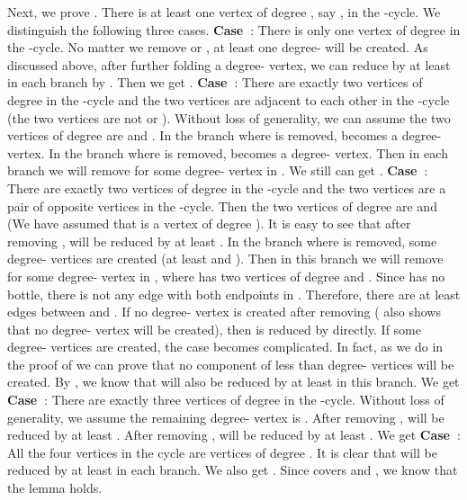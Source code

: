 \documentclass[runningheads]{llncs}
\begin{document}
{Next, we prove . There is at least one vertex of
degree , say , in the -cycle. We distinguish the
following three cases. \textbf{Case~}: There is only one vertex
of degree  in the -cycle. No matter we remove 
or , at least one degree- will be created. As
discussed above, after further folding a degree- vertex, we can
reduce  by at least  in each branch by . Then
we get . \textbf{Case~}: There are exactly two
vertices of degree  in the -cycle and the two vertices
are adjacent to each other in the -cycle (the two vertices are
not  or ). Without loss of generality, we can
assume the two vertices of degree  are  and . In the
branch where  is removed,  becomes a degree-
vertex. In the branch where  is removed,  becomes a
degree- vertex. Then in each branch we will remove  for
some degree- vertex  in . We still can get .
 \textbf{Case~}: There are exactly two
vertices of degree  in the -cycle and the two vertices
are a pair of opposite vertices in the -cycle. Then the two
vertices of degree  are  and  (We have assumed that
 is a vertex of degree ). It is easy to see that after
removing ,  will be reduced by at least . In the
branch where  is removed, some degree- vertices are
created (at least  and ). Then in this branch we will remove
 for some degree- vertex  in , where  has two
vertices of degree   and . Since  has no bottle,
there is not any edge with both endpoints in . Therefore,
there are at least  edges between  and . If no
degree- vertex is created after removing  (
also shows that no degree- vertex will be created), then  is
reduced by  directly. If some degree- vertices are
created, the case becomes complicated. In fact, as we do in the
proof of  we can prove that no component of less
than  degree- vertices will be created. By  , we
know that  will also be reduced by at least  in this
branch. We get 
\textbf{Case~}: There are exactly three vertices of degree
 in the -cycle. Without loss of generality, we assume
the remaining degree- vertex is . After removing ,
 will be reduced by at least . After removing ,
 will be reduced by at least . We get  \textbf{Case~}: All the four vertices in the
cycle are vertices of degree . It is clear that  will be
reduced by at least  in each branch. We also get .
Since  covers  and , we know
that the lemma holds. }




\end{document}
